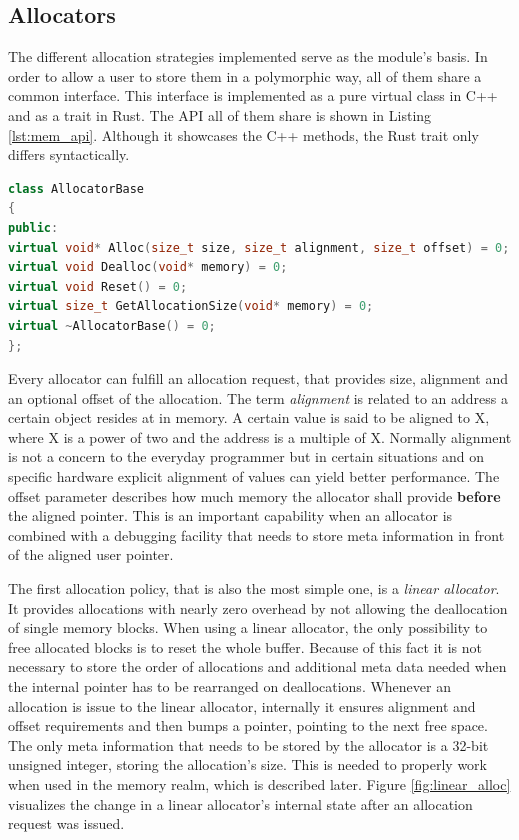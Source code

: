 \clearpage

\subsection{Allocators}

The different allocation strategies implemented serve as the module's basis. In order to allow a user to store them in a polymorphic way, all of them share a common interface. This interface is implemented as a pure virtual class in C++ and as a trait in Rust. The \ac{API} all of them share is shown in Listing \ref{lst:mem_api}. Although it showcases the C++ methods, the Rust trait only differs syntactically.\\

\begin{lstlisting}[caption={Common interface among all allocator implementation. Rust trait only differs syntactically from this C++ sample.}, label={lst:mem_api}, language={C++}]
class AllocatorBase
{
public:
virtual void* Alloc(size_t size, size_t alignment, size_t offset) = 0;
virtual void Dealloc(void* memory) = 0;
virtual void Reset() = 0;
virtual size_t GetAllocationSize(void* memory) = 0;
virtual ~AllocatorBase() = 0;
};
\end{lstlisting}

\noindent
Every allocator can fulfill an allocation request, that provides size, alignment and an optional offset of the allocation.  The term \textit{alignment} is related to an address a certain object resides at in memory. A certain value is said to be aligned to X, where X is a power of two and the address is a multiple of X. Normally alignment is not a concern to the everyday programmer but in certain situations and on specific hardware explicit alignment of values can yield better performance. The offset parameter describes how much memory the allocator shall provide \textbf{before} the aligned pointer. This is an important capability when an allocator is combined with a debugging facility that needs to store meta information in front of the aligned user pointer. 

The first allocation policy, that is also the most simple one, is a \textit{linear allocator}. It provides allocations with nearly zero overhead by not allowing the deallocation of single memory blocks. When using a linear allocator, the only possibility to free allocated blocks is to reset the whole buffer. Because of this fact it is not necessary to store the order of allocations and additional meta data needed when the internal pointer has to be rearranged on deallocations. Whenever an allocation is issue to the linear allocator, internally it ensures alignment and offset requirements and then bumps a pointer, pointing to the next free space. The only meta information that needs to be stored by the allocator is a 32-bit unsigned integer, storing the allocation's size. This is needed to properly work when used in the memory realm, which is described later. Figure \ref{fig:linear_alloc} visualizes the change in a linear allocator's internal state after an allocation request was issued.

